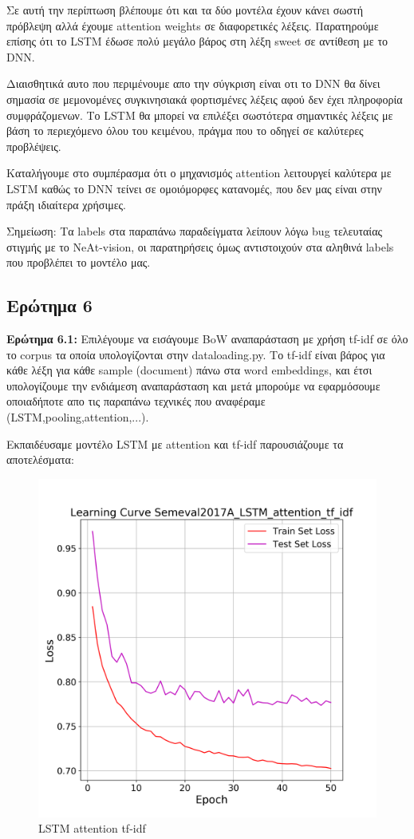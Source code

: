 \documentclass[12pt]{article}
\begin{document}
Σε αυτή την περίπτωση βλέπουμε ότι και τα δύο μοντέλα έχουν κάνει σωστή πρόβλεψη αλλά έχουμε attention weights σε διαφορετικές λέξεις.
Παρατηρούμε επίσης ότι το LSTM έδωσε πολύ μεγάλο βάρος στη λέξη sweet σε αντίθεση με το DNN. 

Διαισθητικά αυτο που περιμένουμε απο την σύγκριση είναι οτι το DNN θα δίνει σημασία σε μεμονομένες συγκινησιακά φορτισμένες λέξεις αφού δεν έχει πληροφορία συμφράζομενων. Το LSTM θα μπορεί να επιλέξει σωστότερα σημαντικές λέξεις με βάση το περιεχόμενο όλου του κειμένου, πράγμα που το οδηγεί σε καλύτερες προβλέψεις.

Καταλήγουμε στο συμπέρασμα ότι ο μηχανισμός attention λειτουργεί καλύτερα με LSTM καθώς το DNN τείνει σε ομοιόμορφες κατανομές, που δεν μας είναι στην πράξη ιδιαίτερα χρήσιμες.

Σημείωση: Τα labels στα παραπάνω παραδείγματα λείπουν λόγω bug τελευταίας στιγμής με το NeΑt-vision, οι παρατηρήσεις όμως αντιστοιχούν στα αληθινά labels που προβλέπει το μοντέλο μας.


\subsection{Ερώτημα 6}
\textbf{Ερώτημα 6.1:}
Επιλέγουμε να εισάγουμε BoW αναπαράσταση με χρήση tf-idf σε όλο το corpus τα οποία υπολογίζονται στην dataloading.py. Το tf-idf είναι βάρος για κάθε λέξη για κάθε sample (document) πάνω στα word embeddings, και έτσι υπολογίζουμε την ενδιάμεση αναπαράσταση και μετά μπορούμε να εφαρμόσουμε οποιαδήποτε απο τις παραπάνω τεχνικές που αναφέραμε (LSTM,pooling,attention,...).

Εκπαιδέυσαμε μοντέλο LSTM με attention και tf-idf παρουσιάζουμε τα αποτελέσματα:


\begin{figure}[h!]
	\centering
	\includegraphics[width=0.6\linewidth]{./img/Semeval2017A/LSTM_attention_tf_idf_loss}
	\caption{LSTM attention tf-idf}
	\label{fig:sin}
\end{figure}
\end{document}
